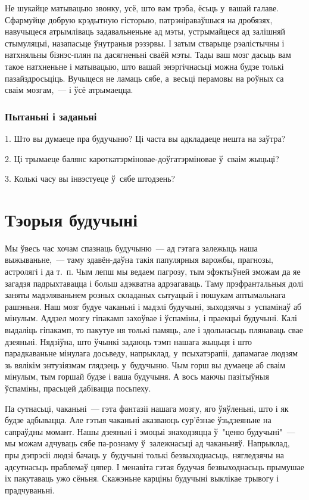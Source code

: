 Не шукайце матывацыю звонку, усё, што вам трэба, ёсьць у~вашай галаве. Сфармуйце добрую крэдытную гісторыю, патрэніраваўшыся на дробязях, навучыцеся атрымліваць задавальненьне ад мэты, устрымайцеся ад залішняй стымуляцыі, назапасьце ўнутраныя рэзэрвы. І затым стварыце рэалістычны і натхняльны бізнэс-плян па дасягненьні сваёй мэты. Тады ваш мозг дасьць вам такое натхненьне і матывацыю, што вашай энэргічнасьці можна будзе толькі пазайздросьціць. Вучыцеся не ламаць сябе, а~весьці перамовы на роўных са сваім мозгам,~--- і ўсё атрымаецца.

\subsubsection{Пытаньні і заданьні}

1. Што вы думаеце пра будучыню? Ці часта вы адкладаеце нешта на заўтра?

2. Ці трымаеце балянс кароткатэрміновае-доўгатэрміновае ў~сваім жыцьці?

3. Колькі часу вы інвэстуеце ў~сябе штодзень?


\section{Тэорыя будучыні}

Мы ўвесь час хочам спазнаць будучыню~--- ад гэтага залежыць наша выжываньне,~--- таму здавён-даўна такія папулярныя варожбы, прагнозы, астролягі і да т.~п. Чым лепш мы ведаем пагрозу, тым эфэктыўней зможам да яе загадзя падрыхтавацца і больш адэкватна адрэагаваць. Таму прэфрантальныя долі заняты мадэляваньнем розных складаных сытуацый і пошукам аптымальнага рашэньня. Наш мозг будуе чаканьні і мадэлі будучыні, зыходзячы з~успамінаў аб мінулым. Аддзел мозгу гіпакамп захоўвае і ўспаміны, і праекцыі будучыні. Калі выдаліць гіпакамп, то пакутуе ня толькі памяць, але і здольнасьць плянаваць свае дзеяньні. Нядзіўна, што ўчынкі задаюць тэмп нашага жыцьця і што парадкаваньне мінулага досьведу, напрыклад, у~псыхатэрапіі, дапамагае людзям зь вялікім энтузіязмам глядзець у~будучыню. Чым горш вы думаеце аб сваім мінулым, тым горшай будзе і ваша будучыня. А вось маючы пазітыўныя ўспаміны, прасьцей дабівацца посьпеху.

Па сутнасьці, чаканьні~--- гэта фантазіі нашага мозгу, яго ўяўленьні, што і як будзе адбывацца. Але гэтыя чаканьні аказваюць сур'ёзнае ўзьдзеяньне на сапраўдны момант. Нашы дзеяньні і эмоцыі знаходзяцца ў~"ценю будучыні"~--- мы можам адчуваць сябе па-рознаму ў~залежнасьці ад чаканьняў. Напрыклад, пры дэпрэсіі людзі бачаць у~будучыні толькі безвыходнасьць, нягледзячы на адсутнасьць праблемаў цяпер. І менавіта гэтая будучая безвыходнасьць прымушае іх пакутаваць ужо сёньня. Скажэньне карціны будучыні выклікае трывогу і прадчуваньні.

